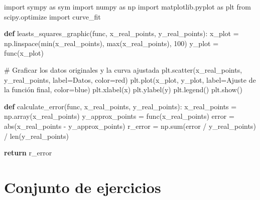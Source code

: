 \documentclass[
  letterpaper,
  DIV=11,
  numbers=noendperiod]{scrartcl}
\newenvironment{Shaded}{\begin{snugshade}}{\end{snugshade}}
\newcommand{\BuiltInTok}[1]{\textcolor[rgb]{0.00,0.23,0.31}{#1}}
\newcommand{\CommentTok}[1]{\textcolor[rgb]{0.37,0.37,0.37}{#1}}
\newcommand{\ControlFlowTok}[1]{\textcolor[rgb]{0.00,0.23,0.31}{\textbf{#1}}}
\newcommand{\DecValTok}[1]{\textcolor[rgb]{0.68,0.00,0.00}{#1}}
\newcommand{\ImportTok}[1]{\textcolor[rgb]{0.00,0.46,0.62}{#1}}
\newcommand{\KeywordTok}[1]{\textcolor[rgb]{0.00,0.23,0.31}{\textbf{#1}}}
\newcommand{\NormalTok}[1]{\textcolor[rgb]{0.00,0.23,0.31}{#1}}
\newcommand{\OperatorTok}[1]{\textcolor[rgb]{0.37,0.37,0.37}{#1}}
\newcommand{\StringTok}[1]{\textcolor[rgb]{0.13,0.47,0.30}{#1}}
\begin{document}
\begin{Shaded}
\begin{Highlighting}[]

\ImportTok{import}\NormalTok{ sympy }\ImportTok{as}\NormalTok{ sym}
\ImportTok{import}\NormalTok{ numpy }\ImportTok{as}\NormalTok{ np}
\ImportTok{import}\NormalTok{ matplotlib.pyplot }\ImportTok{as}\NormalTok{ plt}
\ImportTok{from}\NormalTok{ scipy.optimize }\ImportTok{import}\NormalTok{ curve\_fit}

\KeywordTok{def}\NormalTok{ leasts\_squares\_graphic(func, x\_real\_points, y\_real\_points):}
\NormalTok{    x\_plot }\OperatorTok{=}\NormalTok{ np.linspace(}\BuiltInTok{min}\NormalTok{(x\_real\_points), }\BuiltInTok{max}\NormalTok{(x\_real\_points), }\DecValTok{100}\NormalTok{)}
\NormalTok{    y\_plot }\OperatorTok{=}\NormalTok{ func(x\_plot)}
    
    \CommentTok{\# Graficar los datos originales y la curva ajustada}
\NormalTok{    plt.scatter(x\_real\_points, y\_real\_points, label}\OperatorTok{=}\StringTok{\textquotesingle{}Datos\textquotesingle{}}\NormalTok{, color}\OperatorTok{=}\StringTok{\textquotesingle{}red\textquotesingle{}}\NormalTok{)}
\NormalTok{    plt.plot(x\_plot, y\_plot, label}\OperatorTok{=}\StringTok{\textquotesingle{}Ajuste de la función final\textquotesingle{}}\NormalTok{, color}\OperatorTok{=}\StringTok{\textquotesingle{}blue\textquotesingle{}}\NormalTok{)}
\NormalTok{    plt.xlabel(}\StringTok{\textquotesingle{}x\textquotesingle{}}\NormalTok{)}
\NormalTok{    plt.ylabel(}\StringTok{\textquotesingle{}y\textquotesingle{}}\NormalTok{)}
\NormalTok{    plt.legend()}
\NormalTok{    plt.show()}

\KeywordTok{def}\NormalTok{ calculate\_error(func, x\_real\_points, y\_real\_points):}
\NormalTok{    x\_real\_points }\OperatorTok{=}\NormalTok{ np.array(x\_real\_points)}
\NormalTok{    y\_approx\_points }\OperatorTok{=}\NormalTok{ func(x\_real\_points)}
\NormalTok{    error }\OperatorTok{=} \BuiltInTok{abs}\NormalTok{(x\_real\_points }\OperatorTok{{-}}\NormalTok{ y\_approx\_points)}
\NormalTok{    r\_error }\OperatorTok{=}\NormalTok{ np.}\BuiltInTok{sum}\NormalTok{(error }\OperatorTok{/}\NormalTok{ y\_real\_points) }\OperatorTok{/} \BuiltInTok{len}\NormalTok{(y\_real\_points)}
    
    \ControlFlowTok{return}\NormalTok{ r\_error}
    
\end{Highlighting}
\end{Shaded}

\section{Conjunto de ejercicios}\label{conjunto-de-ejercicios-1}
\end{document}
